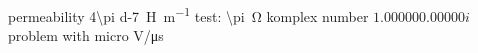 \documentclass{scrbook}
\begin{document}
  permeability \SI{4\pi d-7}{\henry\per\m}\newline
  test: \SI{\pi}{\ohm}
  komplex number \(\num{+1.00000+0.00000i}\) \newline
  problem with micro \unit{\V/\micro\s}
\end{document}
